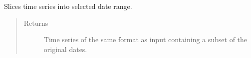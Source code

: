 \documentclass[letterpaper,10pt,english]{sphinxmanual}
\begin{document}
\begin{fulllineitems}

\begin{fulllineitems}
\label{\detokenize{dalio.pipe:dalio.pipe.select.DateSelect.transform}}
Slices time series into selected date range.
\begin{quote}\begin{description}
\item[{Returns}] \leavevmode
Time series of the same format as input containing a subset of
the original dates.

\end{description}\end{quote}

\end{fulllineitems}


\end{fulllineitems}

\end{document}
